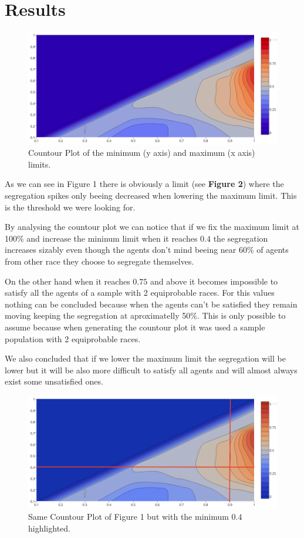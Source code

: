 \documentclass[a4paper,titlepage,11pt]{article}
\begin{document}
\section{Results}

\begin{figure}[h]
    \centering
    \includegraphics[scale=0.40]{img/ploty.png}
    \caption{Countour Plot of the minimum (y axis) and maximum (x axis) limits.}
\end{figure}

As we can see in Figure 1 there is obviously a limit (see \textbf{Figure 2}) where the segregation spikes only beeing
decreased when lowering the maximum limit. This is the threshold we were looking for.

By analysing the countour plot we can notice that if we fix the maximum limit at 100\% and increase the mininum limit when
it reaches $0.4$ the segregation increases sizably even though the agents don't mind beeing near 60\% of agents from other
race they choose to segregate themselves.

On the other hand when it reaches $0.75$ and above it becomes impossible to satisfy all the agents of a sample with 2
equiprobable races. For this values nothing can be concluded because when the agents can't be satisfied they remain moving
keeping the segregation at aproximatelly 50\%. This is only possible to assume because when generating the countour plot
it was used a sample population with 2 equiprobable races.

We also concluded that if we lower the maximum limit the segregation will be lower but it will be also more difficult to
satisfy all agents and will almost always exist some unsatisfied ones.

\begin{figure}[h]
    \centering
    \includegraphics[scale=0.40]{img/ploty-a.png}
    \caption{Same Countour Plot of Figure 1 but with the minimum $0.4$ highlighted.}
\end{figure}
\end{document}
